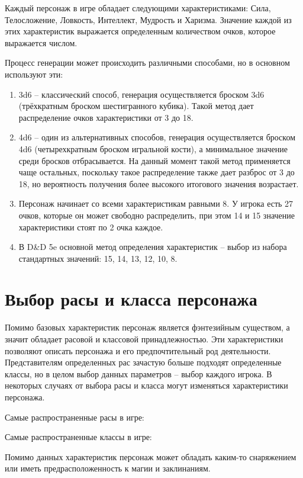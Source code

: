 \documentclass[12pt,a4paper]{article}
\begin{document}
Каждый персонаж в игре обладает следующими характеристиками: Сила, Телосложение, Ловкость, Интеллект, Мудрость и Харизма. Значение каждой из этих характеристик выражается определенным количеством очков, которое выражается числом.

Процесс генерации может происходить различными способами, но в основном используют эти:

\begin{enumerate}
    \item 3d6 -- классический способ, генерация осуществляется броском 3d6 (трёхкратным броском шестигранного кубика). Такой метод дает распределение очков характеристики от 3 до 18.

    \item 4d6 -- один из альтернативных способов, генерация осуществляется броском 4d6 (четырехкратным броском игральной кости), а минимальное значение среди бросков отбрасывается. На данный момент такой метод применяется чаще остальных, поскольку такое распределение также дает разброс от 3 до 18, но вероятность получения более высокого итогового значения возрастает.

    \item Персонаж начинает со всеми характеристикам равными 8. У игрока есть 27 очков, которые он может свободно распределить, при этом 14 и 15 значение характеристики стоят по 2 очка каждое.

    \item В D\&D 5e основной метод определения характеристик -- выбор из набора стандартных значений: 15, 14, 13, 12, 10, 8.
\end{enumerate}

\section{Выбор расы и класса персонажа}

Помимо базовых характеристик персонаж является фэнтезийным существом, а значит обладает расовой и классовой принадлежностью. Эти характеристики позволяют описать персонажа и его предпочтительный род деятельности. Представителям определенных рас зачастую больше подходят определенные классы, но в целом выбор данных параметров -- выбор каждого игрока. В некоторых случаях от выбора расы и класса могут изменяться характеристики персонажа.

Самые распространенные расы в игре:

Самые распространенные классы в игре:

Помимо данных характеристик персонаж может обладать каким-то снаряжением или иметь предрасположенность к магии и заклинаниям.
\end{document}
